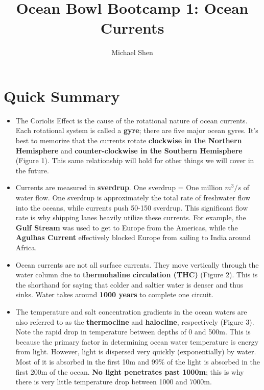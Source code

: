 \documentclass{article}
\begin{document}
\title{Ocean Bowl Bootcamp 1: Ocean Currents}
\author{Michael Shen}
\maketitle

\section{Quick Summary}
\begin{itemize}
	\item The Coriolis Effect is the cause of the rotational nature of ocean currents. Each rotational system is called a \textbf{gyre}; there are five major ocean gyres. It's best to memorize that the currents rotate \textbf{clockwise in the Northern Hemisphere} and \textbf{counter-clockwise in the Southern Hemisphere} (Figure 1). This same relationship will hold for other things we will cover in the future.
	\item Currents are measured in \textbf{sverdrup}. One sverdrup = One million $m^3/s$ of water flow. One sverdrup is approximately the total rate of freshwater flow into the oceans, while currents push 50-150 sverdrup. This significant flow rate is why shipping lanes heavily utilize these currents. For example, the \textbf{Gulf Stream} was used to get to Europe from the Americas, while the \textbf{Agulhas Current} effectively blocked Europe from sailing to India around Africa.
	\item Ocean currents are not all surface currents. They move vertically through the water column due to \textbf{thermohaline circulation (THC)} (Figure 2). This is the shorthand for saying that colder and saltier water is denser and thus sinks. Water takes around \textbf{1000 years} to complete one circuit.
	\item The temperature and salt concentration gradients in the ocean waters are also referred to as the \textbf{thermocline} and \textbf{halocline}, respectively (Figure 3). Note the rapid drop in temperature between depths of 0 and 500m. This is because the primary factor in determining ocean water temperature is energy from light. However, light is dispersed very quickly (exponentially) by water. Most of it is absorbed in the first 10m and 99\% of the light is absorbed in the first 200m of the ocean. \textbf{No light penetrates past 1000m}; this is why there is very little temperature drop between 1000 and 7000m. 
\end{itemize}
\end{document}
